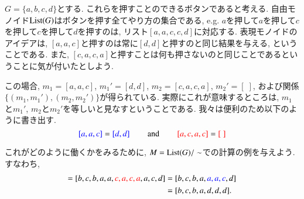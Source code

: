 \begin{example}\label{ex:presented monoid}


$G=\{a,b,c,d\}$とする. これらを押すことのできるボタンであると考える. 自由モノイド$\List(G)$はボタンを押す全てやり方の集合である, e.g. $a$を押して$a$を押して$c$を押して$c$を押して$d$を押すのは, リスト$[a,a,c,c,d]$に対応する. 表現モノイドのアイデアは, $[a,a,c]$と押すのは常に$[d,d]$と押すのと同じ結果を与える, ということである. また, $[c,a,c,a]$と押すことは何も押さないのと同じことであるということに気が付いたとしよう. 


この場合, $m_1=[a,a,c]$, $m_1'=[d,d]$, $m_2=[c,a,c,a]$, $m_2'=[\;]$, および関係$\{(m_1,m_1'), (m_2,m_2')\}$が得られている. 実際にこれが意味するところは, $m_1$と$m_1'$, $m_2$と$m_2'$を等しいと見なすということである. 我々は便利のため以下のように書き出す.
$${\color{blue}{[a,a,c]}}={\color{blue}{[d,d]}}\hsp\tn{and}\hsp{\color{red}{[a,c,a,c]}}={\color{red}{[\;]}}
$$ 

これがどのように働くかをみるために, $M=\List(G)/\sim$での計算の例を与えよう. すなわち,
\begin{align*}
[b,c,b,{\color{blue}{d,d}},a,c,a,a,c,d] = [b,c,b,a,a,{\color{red}{c,a,c,a}},a,c,d] &= [b,c,b,a,{\color{blue}{a,a,c}},d]\\
&= [b,c,b,a,d,d,d].
\end{align*}

\end{example}

